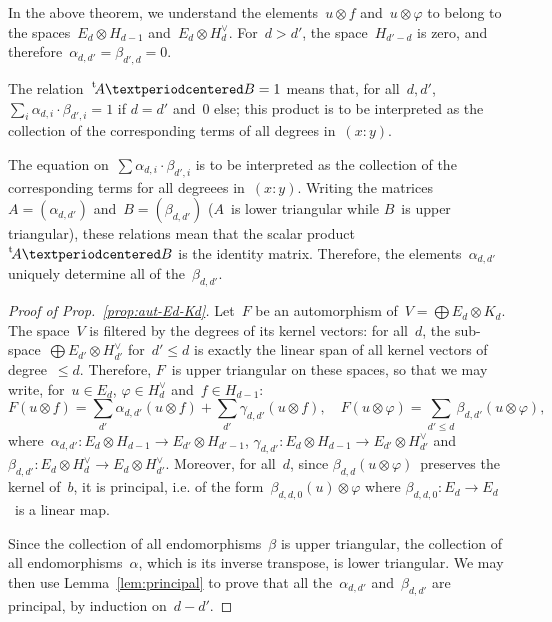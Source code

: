 \documentclass{article}
\def\transpose#1{{\vphantom{#1}}^{\mathrm{t}}\!#1}
\begin{document}
In the above theorem, we understand the elements~$u ⊗ f$ and~$u ⊗ φ$ to
belong to the spaces~$E_d ⊗ H_{d-1}$ and~$E_d ⊗ H_d^{∨}$. For~$d > d'$,
the space~$H_{d' - d}$ is zero, and therefore~$α_{d,d'} = β_{d',d} = 0$.

The relation~$\transpose{A} · B = 1$ means that, for all~$d, d'$, $∑_i
α_{d,i} · β_{d',i} = 1$ if $d = d'$ and~$0$ else; this product is to be
interpreted as the collection of the corresponding terms of all degrees
in~$(x:y)$.

The equation on~$∑
α_{d,i} · β_{d',i}$ is to be interpreted as the collection of the
corresponding terms for all degreees in~$(x:y)$. Writing the matrices~$A
= (α_{d,d'})$ and~$B = (β_{d,d'})$ ($A$~is lower triangular while $B$~is
upper triangular), these relations mean that the scalar
product~$\transpose{A} · B$ is the identity matrix. Therefore, the
elements~$α_{d,d'}$ uniquely determine all of the~$β_{d,d'}$.


\begin{proof}[Proof of Prop.~\ref{prop:aut-Ed-Kd}]
Let~$F$ be an automorphism of~$V = ⨁ E_d ⊗ K_d$. The space~$V$ is
filtered by the degrees of its kernel vectors: for all~$d$, the
sub-space~$⨁ E_{d'} ⊗ H_{d'}^{∨}$ for~$d' ≤ d$ is exactly the linear span
of all kernel vectors of degree~$≤ d$. Therefore, $F$~is upper triangular
on these spaces, so that we may write, for~$u ∈ E_d$, $φ ∈ H_{d}^{∨}$
and~$f ∈ H_{d-1}$:
\begin{equation}
F(u ⊗ f) = ∑_{d'} α_{d,d'} (u ⊗ f) + ∑_{d'} γ_{d,d'} (u ⊗ f), \quad
F(u ⊗ φ) = ∑_{d' ≤ d} β_{d,d'} (u ⊗ φ),
\end{equation}
where~$α_{d,d'}: E_d ⊗ H_{d-1} → E_{d'} ⊗ H_{d'-1}$, $γ_{d,d'}: E_d ⊗
H_{d-1} → E_{d'} ⊗ H_{d'}^{∨}$ and~$β_{d,d'}: E_d ⊗ H_{d}^{∨} → E_d ⊗
H_{d'}^{∨}$. Moreover, for all~$d$, since $β_{d,d}(u ⊗ φ)$~preserves the
kernel of~$b$, it is principal, i.e. of the form~$β_{d,d,0} (u) ⊗ φ$
where $β_{d,d,0}: E_d → E_d$~is a linear map.


Since the collection of all endomorphisms~$β$ is upper triangular, the
collection of all endomorphisms~$α$, which is its inverse transpose, is
lower triangular. We may then use Lemma~\ref{lem:principal} to prove that
all the~$α_{d,d'}$ and~$β_{d,d'}$ are principal, by induction on~$d-d'$.
\end{proof}
\end{document}
